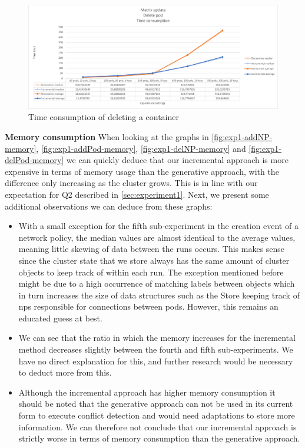 \begin{figure}[H]
    \centering
    \includegraphics[width=\textwidth]{images/experiment1/delPod-time.png}
    \caption{Time consumption of deleting a container}
    \label{fig:exp1-delPod-time}
\end{figure}



\textbf{Memory consumption}
\newline When looking at the graphs in \autoref{fig:exp1-addNP-memory}, \autoref{fig:exp1-addPod-memory}, \autoref{fig:exp1-delNP-memory}  and \autoref{fig:exp1-delPod-memory} we can quickly deduce that our incremental approach is more expensive in terms of memory usage than the generative approach, with the difference only increasing as the cluster grows. This is in line with our expectation for Q2 described in \autoref{sec:experiment1}. Next, we present some additional observations we can deduce from these graphs:
\begin{itemize}
    \item With a small exception for the fifth sub-experiment in the creation event of a network policy, the median values are almost identical to the average values, meaning little skewing of data between the runs occurs. This makes sense since the cluster state that we store always has the same amount of cluster objects to keep track of within each run. The exception mentioned before might be due to a high occurrence of matching labels between objects which in turn increases the size of data structures such as the Store keeping track of \acrshort{np}s responsible for connections between pods. However, this remains an educated guess at best.
    \item We can see that the ratio in which the memory increases for the incremental method decreases slightly between the fourth and fifth sub-experiments. We have no direct explanation for this, and further research would be necessary to deduct more from this. 
 	\item Although the incremental approach has higher memory consumption it should be noted that the generative approach can not be used in its current form to execute conflict detection and would need adaptations to store more information. We can therefore not conclude that our incremental approach is strictly worse in terms of memory consumption than the generative approach.
\end{itemize}

